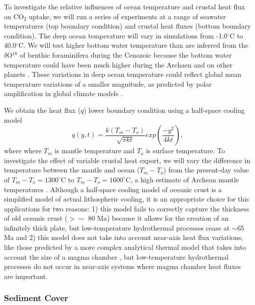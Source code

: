 \documentclass[authoryear,round,12pt]{article}
\begin{document}
To investigate the relative influences of ocean temperature and
crustal heat flux on CO$_2$ uptake, we will run a series of
experiments at a range of seawater temperatures (top boundary
condition) and crustal heat fluxes (bottom boundary condition). The
deep ocean temperature will vary in simulations from -1.0$^{\circ}$C
to 40.0$^{\circ}$C. We will test higher bottom water temperature than
are inferred from the $\delta$O$^{18}$ of benthic foraminifera during
the Cenozoic \citep{zachos2001} because the bottom water temperature
could have been much higher during the Archaen \citep[although there
are other explanations for the observed
$\delta$O$^{18}$,][]{kasting2006atmospheric} and on other planets
\citep{abbot2012}. These variations in deep ocean temperature could
reflect global mean temperature variations of a smaller magnitude, as
predicted by polar amplification in global climate models
\citep{masson-delmotte2005}.



We obtain the heat flux ($q$) lower boundary condition using a half-space
cooling model \citep{turcotte2001}
%
\begin{equation}
q(y,t) = \frac{k(T_m - T_o)}{\sqrt{\pi k t}} exp \left (\frac{-y^2}{4 k t} \right),
\label{halfSpace}
\end{equation}
%
where where $T_m$ is mantle temperature and $T_o$ is surface
temperature. To investigate the effect of variable crustal heat
export, we will vary the difference in temperature between the mantle
and ocean ($T_m - T_o$) from the present-day value of $T_m - T_o =
1300^{\circ}$C to $T_m - T_o = 1600^{\circ}$C, a high
estimate of Archean mantle temperatures \citep{bickle1986}. Although a
half-space cooling model of oceanic crust is a simplified model of
actual lithospheric cooling, it is an appropriate choice for this
applications for two reasons: 1) this model fails to correctly capture
the thickness of old oceanic crust ($>\sim $ 80 Ma) because it allows
for the creation of an infinitely thick plate, but low-temperature
hydrothermal processes cease at $\sim$65 Ma and 2) this model does not
take into account near-axis heat flux variations, like those predicted
by a more complex analytical thermal model that takes into account the
size of a magma chamber \citep{sleep1975}, but low-temperature
hydrothermal processes do not occur in near-axis systems where magma
chamber heat fluxes are important.

\subsubsection{Sediment Cover}
\end{document}
